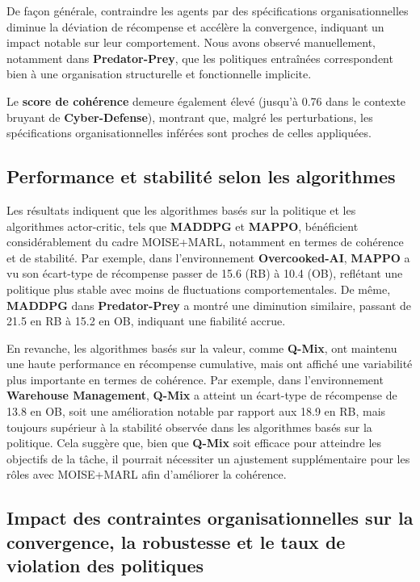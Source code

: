 \documentclass[dissemination]{jfsma}
\begin{document}
\medskip
\noindent
De façon générale, contraindre les agents par des spécifications organisationnelles diminue la déviation de récompense et accélère la convergence, indiquant un impact notable sur leur comportement. Nous avons observé manuellement, notamment dans \textbf{Predator-Prey}, que les politiques entraînées correspondent bien à une organisation structurelle et fonctionnelle implicite. 

\medskip
\noindent
Le \textbf{score de cohérence} demeure également élevé (jusqu’à 0.76 dans le contexte bruyant de \textbf{Cyber-Defense}), montrant que, malgré les perturbations, les spécifications organisationnelles inférées sont proches de celles appliquées.

\subsection{Performance et stabilité selon les algorithmes}

Les résultats indiquent que les algorithmes basés sur la politique et les algorithmes actor-critic, tels que \textbf{MADDPG} et \textbf{MAPPO}, bénéficient considérablement du cadre MOISE+MARL, notamment en termes de cohérence et de stabilité. Par exemple, dans l'environnement \textbf{Overcooked-AI}, \textbf{MAPPO} a vu son écart-type de récompense passer de 15.6 (RB) à 10.4 (OB), reflétant une politique plus stable avec moins de fluctuations comportementales. De même, \textbf{MADDPG} dans \textbf{Predator-Prey} a montré une diminution similaire, passant de 21.5 en RB à 15.2 en OB, indiquant une fiabilité accrue.

En revanche, les algorithmes basés sur la valeur, comme \textbf{Q-Mix}, ont maintenu une haute performance en récompense cumulative, mais ont affiché une variabilité plus importante en termes de cohérence. Par exemple, dans l'environnement \textbf{Warehouse Management}, \textbf{Q-Mix} a atteint un écart-type de récompense de 13.8 en OB, soit une amélioration notable par rapport aux 18.9 en RB, mais toujours supérieur à la stabilité observée dans les algorithmes basés sur la politique. Cela suggère que, bien que \textbf{Q-Mix} soit efficace pour atteindre les objectifs de la tâche, il pourrait nécessiter un ajustement supplémentaire pour les rôles avec MOISE+MARL afin d'améliorer la cohérence.

\subsection{Impact des contraintes organisationnelles sur la convergence, la robustesse et le taux de violation des politiques}
\end{document}
